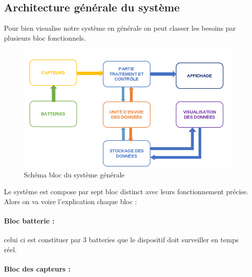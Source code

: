 \subsection{Architecture générale du système}

Pour bien visualise notre système en générale on peut classer les besoins par plusieurs bloc fonctionnels. 



\begin{figure}[H]
	\centering
	\includegraphics[width=17cm]{./img/schemaBloc.png}
	\caption{Schéma bloc du système générale }
	\label{i1}
	
\end{figure}

Le système est compose par sept bloc distinct avec leurs fonctionnement précise. Alors on va voire l'explication chaque bloc :

\paragraph{Bloc batterie : }
 celui ci est constituer par 3 batteries que le dispositif doit surveiller en temps réel.
 
\paragraph{Bloc des capteurs : }
 
